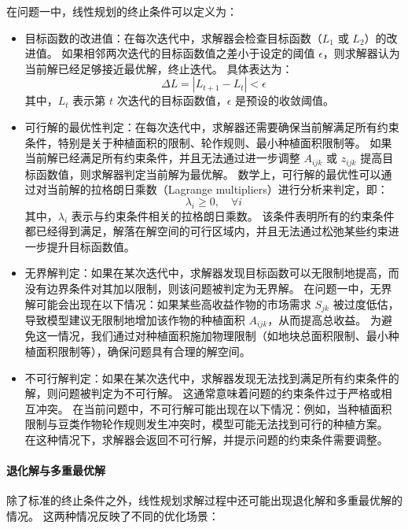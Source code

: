 \documentclass[12pt,a4paper]{nmmcm}
\begin{document}
在问题一中，线性规划的终止条件可以定义为：
\begin{itemize}
  \item 目标函数的改进值：在每次迭代中，求解器会检查目标函数（$L_1$ 或 $L_2$）的改进值。
        如果相邻两次迭代的目标函数值之差小于设定的阈值 $\epsilon$，则求解器认为当前解已经足够接近最优解，终止迭代。
        具体表达为：
        \[
          \Delta L = |L_{t+1} - L_t| < \epsilon
        \]
        其中，$L_t$ 表示第 $t$ 次迭代的目标函数值，$\epsilon$ 是预设的收敛阈值。


  \item 可行解的最优性判定：在每次迭代中，求解器还需要确保当前解满足所有约束条件，特别是关于种植面积的限制、轮作规则、最小种植面积限制等。
        如果当前解已经满足所有约束条件，并且无法通过进一步调整 $A_{ijk}$ 或 $z_{ijk}$ 提高目标函数值，则求解器判定当前解为最优解。
        数学上，可行解的最优性可以通过对当前解的拉格朗日乘数（Lagrange multipliers）进行分析来判定，即：
        \[
          \lambda_i \geq 0, \quad \forall i
        \]
        其中，$\lambda_i$ 表示与约束条件相关的拉格朗日乘数。
        该条件表明所有的约束条件都已经得到满足，解落在解空间的可行区域内，并且无法通过松弛某些约束进一步提升目标函数值。


  \item 无界解判定：如果在某次迭代中，求解器发现目标函数可以无限制地提高，而没有边界条件对其加以限制，则该问题被判定为无界解。
        在问题一中，无界解可能会出现在以下情况：如果某些高收益作物的市场需求 $S_{jk}$ 被过度低估，导致模型建议无限制地增加该作物的种植面积 $A_{ijk}$，从而提高总收益。
        为避免这一情况，我们通过对种植面积施加物理限制（如地块总面积限制、最小种植面积限制等），确保问题具有合理的解空间。


  \item 不可行解判定：如果在某次迭代中，求解器发现无法找到满足所有约束条件的解，则问题被判定为不可行解。
        这通常意味着问题的约束条件过于严格或相互冲突。
        在当前问题中，不可行解可能出现在以下情况：例如，当种植面积限制与豆类作物轮作规则发生冲突时，模型可能无法找到可行的种植方案。
        在这种情况下，求解器会返回不可行解，并提示问题的约束条件需要调整。

\end{itemize}

\paragraph{退化解与多重最优解}

除了标准的终止条件之外，线性规划求解过程中还可能出现退化解和多重最优解的情况。
这两种情况反映了不同的优化场景：
\end{document}
